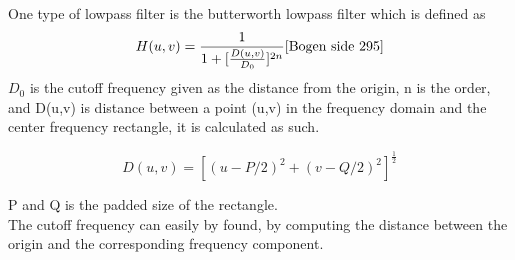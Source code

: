 One type of lowpass filter is the butterworth lowpass filter which is defined as
\begin{equation}
	H(u,v) = \frac{1}{1+[\frac{D(u,v)}{D_0}]^{2n}}
	\label{eq:LBP}
	\cite{Bogen side 295}
\end{equation}
$D_0$ is the cutoff frequency given as the distance from the origin, n  is the order,  and D(u,v) is distance between a point (u,v) in the frequency domain and the center frequency rectangle, it is calculated as such. 

\begin{equation}
D(u,v) = [(u-P/2)^2 + (v-Q/2)^2]^{\frac{1}{2}} 
\end{equation}

P and Q is the padded size of the rectangle. \\


The cutoff frequency can easily by found, by computing the distance between the origin and the corresponding frequency component. 

